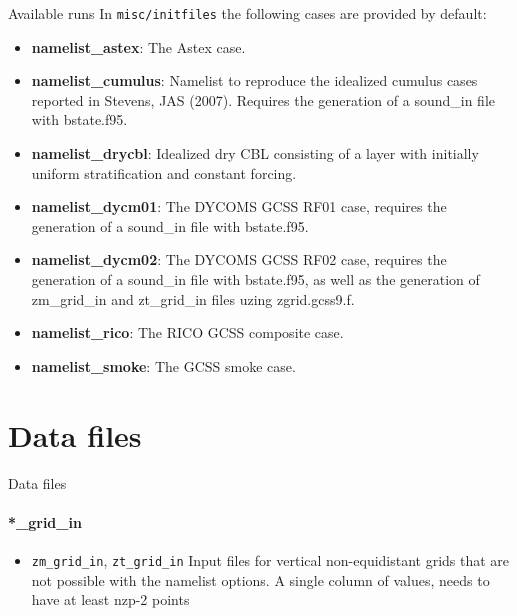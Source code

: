 \documentclass[handout]{beamer}
\newcommand{\code}[1]{{\tt #1}}
\begin{document}
\begin{frame}[allowframebreaks]{Available runs}
 In \code{misc/initfiles} the following cases are provided by default:

\begin{itemize}
\item \textbf{namelist\_astex}: The Astex case.
\item \textbf{namelist\_cumulus}: Namelist to reproduce the idealized
cumulus cases reported in Stevens, JAS (2007). Requires the
generation of a sound\_in file with bstate.f95.
\item \textbf{namelist\_drycbl}: Idealized dry CBL consisting of a
layer with initially uniform stratification and constant forcing.
\item \textbf{namelist\_dycm01}: The DYCOMS GCSS RF01 case, requires
the generation of a sound\_in file with bstate.f95.
\item \textbf{namelist\_dycm02}: The DYCOMS GCSS RF02 case, requires
the generation of a sound\_in file with bstate.f95, as well as the
generation of zm\_grid\_in and zt\_grid\_in files uzing zgrid.gcss9.f.
\item \textbf{namelist\_rico}: The RICO GCSS composite case.
\item \textbf{namelist\_smoke}: The GCSS smoke case.
\end{itemize}
\end{frame}

\section{Data files}
\begin{frame}{Data files}
\framesubtitle{*\_grid\_in}
\begin{itemize}
 \item \code{zm\_grid\_in}, \code{zt\_grid\_in} Input files for vertical non-equidistant grids that are not possible with the namelist options. A single column of values, needs to have at least nzp-2 points
\end{itemize}

\end{frame}
\end{document}
